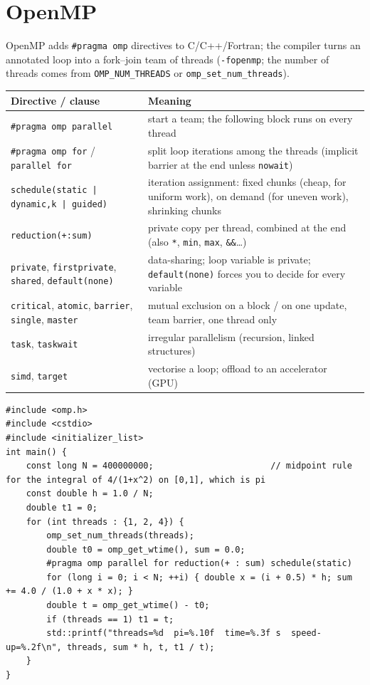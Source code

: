 \documentclass[10pt,a4paper,openany,oneside]{report}
\newcommand{\prio}[1]{\texorpdfstring{\ifcase#1\or{\color{gold}\ding{72}}\or{\color{gold}\ding{72}\ding{72}}\or{\color{gold}\ding{72}\ding{72}\ding{72}}\fi}{}}
\begin{document}
\section{OpenMP \prio{2}}
OpenMP adds \texttt{\#pragma omp} directives to C/C++/Fortran; the compiler turns an annotated loop into a fork--join team of threads (\texttt{-fopenmp}; the number of threads comes from \texttt{OMP\_NUM\_THREADS} or \texttt{omp\_set\_num\_threads}).
\begin{center}\small
\begin{xltabular}{\textwidth}{@{}L{5.6cm}Y@{}}
\toprule
\textbf{Directive / clause} & \textbf{Meaning}\\
\midrule\endhead
\texttt{\#pragma omp parallel} & start a team; the following block runs on every thread\\
\texttt{\#pragma omp for} / \texttt{parallel for} & split loop iterations among the threads (implicit barrier at the end unless \texttt{nowait})\\
\texttt{schedule(static | dynamic,k | guided)} & iteration assignment: fixed chunks (cheap, for uniform work), on demand (for uneven work), shrinking chunks\\
\texttt{reduction(+:sum)} & private copy per thread, combined at the end (also \texttt{*}, \texttt{min}, \texttt{max}, \texttt{\&\&}\ldots)\\
\texttt{private}, \texttt{firstprivate}, \texttt{shared}, \texttt{default(none)} & data-sharing; loop variable is private; \texttt{default(none)} forces you to decide for every variable\\
\texttt{critical}, \texttt{atomic}, \texttt{barrier}, \texttt{single}, \texttt{master} & mutual exclusion on a block / on one update, team barrier, one thread only\\
\texttt{task}, \texttt{taskwait} & irregular parallelism (recursion, linked structures)\\
\texttt{simd}, \texttt{target} & vectorise a loop; offload to an accelerator (GPU)\\
\bottomrule
\end{xltabular}
\end{center}
\begin{lstlisting}[language={[11]C++},basicstyle=\ttfamily\scriptsize]
#include <omp.h>
#include <cstdio>
#include <initializer_list>
int main() {
    const long N = 400000000;                       // midpoint rule for the integral of 4/(1+x^2) on [0,1], which is pi
    const double h = 1.0 / N;
    double t1 = 0;
    for (int threads : {1, 2, 4}) {
        omp_set_num_threads(threads);
        double t0 = omp_get_wtime(), sum = 0.0;
        #pragma omp parallel for reduction(+ : sum) schedule(static)
        for (long i = 0; i < N; ++i) { double x = (i + 0.5) * h; sum += 4.0 / (1.0 + x * x); }
        double t = omp_get_wtime() - t0;
        if (threads == 1) t1 = t;
        std::printf("threads=%d  pi=%.10f  time=%.3f s  speed-up=%.2f\n", threads, sum * h, t, t1 / t);
    }
}
\end{lstlisting}
\end{document}
